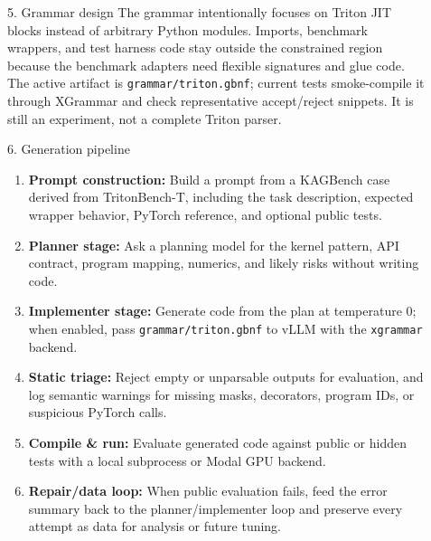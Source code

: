 \documentclass[final]{beamer}
\newlength{\sepwidth}
\newlength{\colwidth}
\newcommand{\separatorcolumn}{\begin{column}{\sepwidth}\end{column}}
\begin{document}
\begin{frame}[t]
\begin{columns}[t]
\begin{column}{\colwidth}
\begin{block}{5. Grammar design}
    The grammar intentionally focuses on Triton JIT blocks instead of arbitrary
    Python modules. Imports, benchmark wrappers, and test harness code stay
    outside the constrained region because the benchmark adapters need flexible
    signatures and glue code. The active artifact is
    \texttt{grammar/triton.gbnf}; current tests smoke-compile it through XGrammar
    and check representative accept/reject snippets. It is still an experiment,
    not a complete Triton parser.

  \end{block}

  \begin{block}{6. Generation pipeline}

    \begin{enumerate}
      \item \textbf{Prompt construction:} Build a prompt from a KAGBench case derived from TritonBench-T, including the task description, expected wrapper behavior, PyTorch reference, and optional public tests.
      \item \textbf{Planner stage:} Ask a planning model for the kernel pattern, API contract, program mapping, numerics, and likely risks without writing code.
      \item \textbf{Implementer stage:} Generate code from the plan at temperature 0; when enabled, pass \texttt{grammar/triton.gbnf} to vLLM with the \texttt{xgrammar} backend.
      \item \textbf{Static triage:} Reject empty or unparsable outputs for evaluation, and log semantic warnings for missing masks, decorators, program IDs, or suspicious PyTorch calls.
      \item \textbf{Compile \& run:} Evaluate generated code against public or hidden tests with a local subprocess or Modal GPU backend.
      \item \textbf{Repair/data loop:} When public evaluation fails, feed the error summary back to the planner/implementer loop and preserve every attempt as data for analysis or future tuning.
    \end{enumerate}

  \end{block}

\end{column}

\separatorcolumn

\begin{column}{\colwidth}


\end{column}
\end{columns}
\end{frame}
\end{document}
